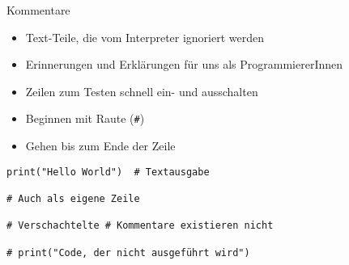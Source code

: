 \begin{frame}[fragile]{Kommentare}
%
\begin{minipage}[t]{.44\linewidth}
\begin{itemize}
\item Text-Teile, die vom Interpreter ignoriert werden
\item Erinnerungen und Erklärungen für uns als ProgrammiererInnen
\item Zeilen zum Testen schnell ein- und ausschalten
\item Beginnen mit Raute (\texttt{\#})
\item Gehen bis zum Ende der Zeile
\end{itemize}
\end{minipage}
%
\begin{minipage}[t]{.55\linewidth}
\phantom{x}
\begin{codebox}
\begin{verbatim}
print("Hello World")  # Textausgabe

# Auch als eigene Zeile

# Verschachtelte # Kommentare existieren nicht

# print("Code, der nicht ausgeführt wird")
\end{verbatim}
\end{codebox}
\end{minipage}
%
\end{frame}


